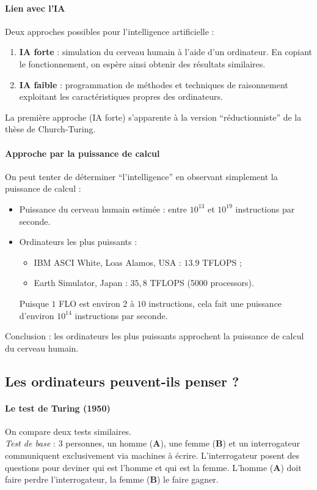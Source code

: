 \begin{description}
\paragraph{Lien avec l'IA}
Deux approches possibles pour l'intelligence artificielle :
\begin{enumerate}
	\item \textbf{IA forte} : simulation du cerveau humain à l'aide d'un ordinateur. En copiant le fonctionnement, on espère ainsi obtenir des résultats similaires.
	\item \textbf{IA faible} : programmation de méthodes et techniques de raisonnement exploitant les caractéristiques propres des ordinateurs.
\end{enumerate}
La première approche (IA forte) s'apparente à la version ``réductionniste'' de la thèse de Church-Turing.

\paragraph{Approche par la puissance de calcul}
On peut tenter de déterminer ``l'intelligence'' en observant simplement la puissance de calcul :
\begin{itemize}
	\item Puissance du cerveau humain estimée : entre $10^{13}$ et $10^{19}$ instructions par seconde.
	\item Ordinateurs les plus puissants :
	\begin{itemize}
	\item IBM ASCI White, Loas Alamos, USA : $13.9$ TFLOPS ;
	\item Earth Simulator, Japan : $35,8$ TFLOPS (5000 processors).
\end{itemize}
Puisque $1$ FLO est environ $2$ à $10$ instructions, cela fait une puissance d'environ $10^{14}$ instructions par seconde.
\end{itemize}
Conclusion : les ordinateurs les plus puissants approchent la puissance de calcul du cerveau humain.
\subsection{Les ordinateurs peuvent-ils penser ?}
\paragraph{Le test de Turing (1950)}
On compare deux tests similaires.\\

\emph{Test de base} : 3 personnes, un homme (\textbf{A}), une femme (\textbf{B}) et un interrogateur communiquent exclusivement via machines à écrire. L'interrogateur posent des questions pour deviner qui est l'homme et qui est la femme. L'homme (\textbf{A}) doit faire perdre l'interrogateur, la femme (\textbf{B}) le faire gagner.\\


\end{description}
